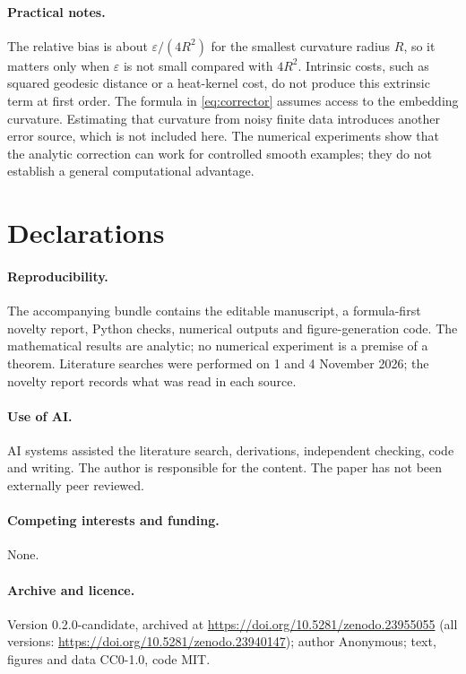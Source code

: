 \documentclass[11pt,a4paper]{article}
\theoremstyle{definition}\newtheorem{definition}[theorem]{Definition}
\theoremstyle{remark}\newtheorem{remark}[theorem]{Remark}
\newcommand{\eps}{\varepsilon}
\begin{document}
\paragraph{Practical notes.} The relative bias is about $\eps/(4R^2)$ for the smallest curvature radius $R$, so it matters only when $\eps$ is not small compared with $4R^2$. Intrinsic costs, such as squared geodesic distance or a heat-kernel cost, do not produce this extrinsic term at first order. The formula in \eqref{eq:corrector} assumes access to the embedding curvature. Estimating that curvature from noisy finite data introduces another error source, which is not included here. The numerical experiments show that the analytic correction can work for controlled smooth examples; they do not establish a general computational advantage.

\section*{Declarations}

\paragraph{Reproducibility.} The accompanying bundle contains the editable manuscript, a formula-first novelty report, Python checks, numerical outputs and figure-generation code. The mathematical results are analytic; no numerical experiment is a premise of a theorem. Literature searches were performed on 1 and 4 November 2026; the novelty report records what was read in each source.

\paragraph{Use of AI.} AI systems assisted the literature search, derivations, independent checking, code and writing. The author is responsible for the content. The paper has not been externally peer reviewed.

\paragraph{Competing interests and funding.} None.

\paragraph{Archive and licence.} Version 0.2.0-candidate, archived at \url{https://doi.org/10.5281/zenodo.23955055} (all versions: \url{https://doi.org/10.5281/zenodo.23940147}); author Anonymous; text, figures and data CC0-1.0, code MIT.
\end{document}
